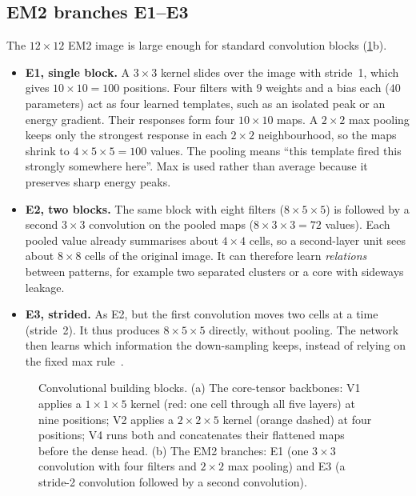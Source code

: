 \subsection{EM2 branches E1--E3}
\label{app:ebranches}
The $12\times12$ EM2 image is large enough for standard convolution blocks (\cref{fig:cnn_blocks}b).
\begin{itemize}
  \item \textbf{E1, single block.} A $3\times3$ kernel slides over the image with stride~1, which gives $10\times10=100$ positions. Four filters with $9$ weights and a bias each ($40$ parameters) act as four learned templates, such as an isolated peak or an energy gradient. Their responses form four $10\times10$ maps. A $2\times2$ max pooling keeps only the strongest response in each $2\times2$ neighbourhood, so the maps shrink to $4\times5\times5=100$ values. The pooling means ``this template fired this strongly somewhere here''. Max is used rather than average because it preserves sharp energy peaks.
  \item \textbf{E2, two blocks.} The same block with eight filters ($8\times5\times5$) is followed by a second $3\times3$ convolution on the pooled maps ($8\times3\times3=72$ values). Each pooled value already summarises about $4\times4$ cells, so a second-layer unit sees about $8\times8$ cells of the original image. It can therefore learn \emph{relations} between patterns, for example two separated clusters or a core with sideways leakage.
  \item \textbf{E3, strided.} As E2, but the first convolution moves two cells at a time (stride~2). It thus produces $8\times5\times5$ directly, without pooling. The network then learns which information the down-sampling keeps, instead of relying on the fixed max rule~\cite{kim2023hotspots}.
\end{itemize}

\begin{figure}[t]
  \centering
  \resizebox{\linewidth}{!}{}
  \caption{Convolutional building blocks. (a) The core-tensor backbones: V1 applies a $1\times1\times5$ kernel (red: one cell through all five layers) at nine positions; V2 applies a $2\times2\times5$ kernel (orange dashed) at four positions; V4 runs both and concatenates their flattened maps before the dense head. (b) The EM2 branches: E1 (one $3\times3$ convolution with four filters and $2\times2$ max pooling) and E3 (a stride-2 convolution followed by a second convolution).}
  \label{fig:cnn_blocks}
\end{figure}

